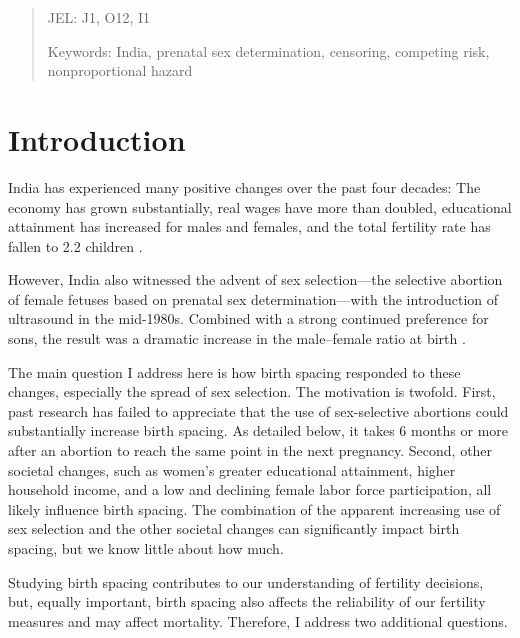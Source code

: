 \documentclass[12pt,letterpaper]{article}
\begin{document}
\begin{abstract}
\noindent JEL: J1, O12, I1

\noindent Keywords: India, prenatal sex determination, censoring, competing risk, 
nonproportional hazard
\end{abstract}

\newpage



\section{Introduction\label{sec:intro}}



India has experienced many positive changes over the past four decades:
The economy has grown substantially,
real wages have more than doubled,
educational attainment has increased for males and females,
and the total fertility rate has fallen to 2.2 children
\citep{Bosworth2008,Dharmalingam2014,Klasen2015,
International-Institute-for-Population-Sciences-IIPS2017}.

However, India also witnessed the advent of sex selection---the selective abortion of 
female fetuses based on prenatal sex determination---with the introduction of ultrasound 
in the mid-1980s.
Combined with a strong continued preference for sons, the result was a dramatic increase 
in the male--female ratio at birth
\citep{das_gupta97,Arnold2002,retherford03b,Guilmoto2012,Portner2015b,Jayachandran2017}.


The main question I address here is how birth spacing responded to these changes, 
especially the spread of sex selection. 
The motivation is twofold.
First, past research has failed to appreciate that the use of sex-selective abortions could 
substantially increase birth spacing. 
As detailed below, it takes 6 months or more after an abortion to reach the same point in 
the next pregnancy. 
Second, other societal changes, such as women's greater educational attainment, higher 
household income, and a low and declining female labor force participation, all 
likely influence birth spacing. 
The combination of the apparent increasing use of sex selection and the other societal 
changes can significantly impact birth spacing, but we know little about how much.

Studying birth spacing contributes to our understanding of fertility decisions, but, equally 
important, birth spacing also affects the reliability of our fertility measures and may 
affect mortality. 
Therefore, I address two additional questions. 
\end{document}
